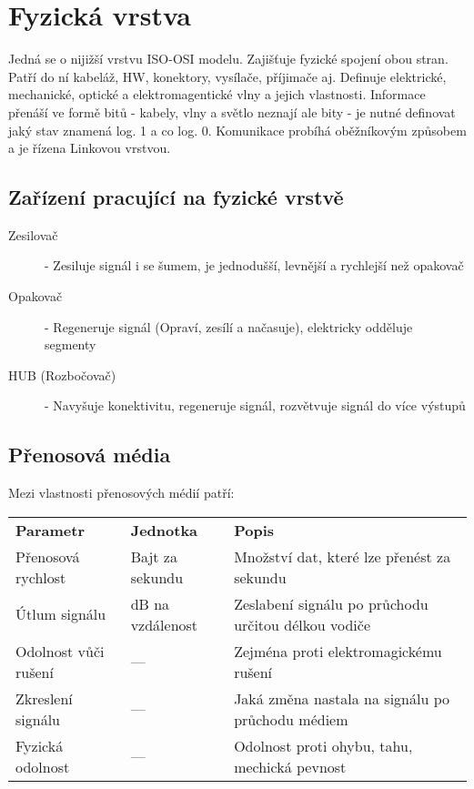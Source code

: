 \section{Fyzická vrstva}
\label{sec:fyzicka-vrstva}
Jedná se o nijižší vrstvu ISO-OSI modelu.
Zajišťuje fyzické spojení obou stran.
Patří do ní kabeláž, HW, konektory, vysílače, příjimače aj.
Definuje elektrické, mechanické, optické a elektromagentické vlny a jejich vlastnosti.
Informace přenáší ve formě bitů - kabely, vlny a světlo neznají ale bity - je nutné definovat jaký stav znamená log. 1 a co log. 0.
Komunikace probíhá oběžníkovým způsobem a je řízena Linkovou vrstvou.
\subsection{Zařízení pracující na fyzické vrstvě}
\begin{description}
  \item[Zesilovač]- Zesiluje signál i se šumem, je jednodušší, levnější a rychlejší než opakovač
  \item[Opakovač]- Regeneruje signál (Opraví, zesílí a načasuje), elektricky odděluje segmenty
  \item[HUB (Rozbočovač)]- Navyšuje konektivitu, regeneruje signál, rozvětvuje signál do více výstupů
\end{description}
\subsection{Přenosová média}
Mezi vlastnosti přenosových médií patří:\\
\begin{tabularx}{\linewidth}{l|l|l}
  \textbf{Parametr}    & \textbf{Jednotka} & \textbf{Popis}                                      \\
  Přenosová rychlost   & Bajt za sekundu   & Množství dat, které lze přenést za sekundu          \\
  \hline
  Útlum signálu        & dB na vzdálenost  & Zeslabení signálu po průchodu určitou délkou vodiče \\
  \hline
  Odolnost vůči rušení & ---               & Zejména proti elektromagickému rušení               \\
  \hline
  Zkreslení signálu    & ---               & Jaká změna nastala na signálu po průchodu médiem    \\
  \hline
  Fyzická odolnost     & ---               & Odolnost proti ohybu, tahu, mechická pevnost        \\
\end{tabularx}

